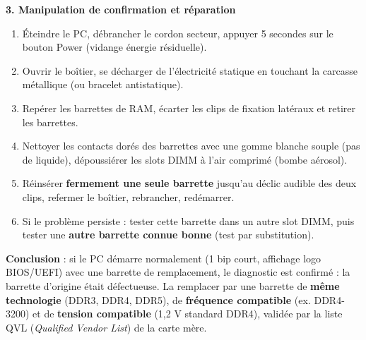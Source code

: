 \documentclass[11pt]{article}
\begin{document}
\begin{exoresolu}
\textbf{3. Manipulation de confirmation et réparation}
\begin{enumerate}
\item Éteindre le PC, débrancher le cordon secteur, appuyer 5 secondes sur le bouton Power (vidange énergie résiduelle).
\item Ouvrir le boîtier, se décharger de l'électricité statique en touchant la carcasse métallique (ou bracelet antistatique).
\item Repérer les barrettes de RAM, écarter les clips de fixation latéraux et retirer les barrettes.
\item Nettoyer les contacts dorés des barrettes avec une gomme blanche souple (pas de liquide), dépoussiérer les slots DIMM à l'air comprimé (bombe aérosol).
\item Réinsérer \textbf{fermement une seule barrette} jusqu'au déclic audible des deux clips, refermer le boîtier, rebrancher, redémarrer.
\item Si le problème persiste : tester cette barrette dans un autre slot DIMM, puis tester une \textbf{autre barrette connue bonne} (test par substitution).
\end{enumerate}
\textbf{Conclusion} : si le PC démarre normalement (1 bip court, affichage logo BIOS/UEFI) avec une barrette de remplacement, le diagnostic est confirmé : la barrette d'origine était défectueuse. La remplacer par une barrette de \textbf{même technologie} (DDR3, DDR4, DDR5), de \textbf{fréquence compatible} (ex. DDR4-3200) et de \textbf{tension compatible} (1,2 V standard DDR4), validée par la liste QVL (\emph{Qualified Vendor List}) de la carte mère.
\end{exoresolu}
\end{document}
